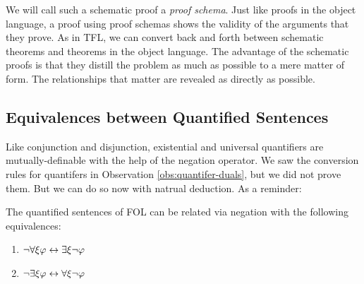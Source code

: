 
We will call such a schematic proof a \emph{proof schema}. Just like proofs
in the object language, a proof using proof schemas shows the validity of the
arguments that they prove. As in TFL, we can convert back and forth between
schematic theorems and theorems in the object language. The advantage of the
schematic proofs is that they distill the problem as much as possible to a mere
matter of form. The relationships that matter are revealed as directly as
possible.

\subsection{Equivalences between Quantified Sentences}

Like conjunction and disjunction, existential and universal quantifiers are
mutually-definable with the help of the negation operator. We saw the conversion
rules for quantifers in Observation \ref{obs:quantifer-duals}, but we did not
prove them. But we can do so now with natrual deduction. As a reminder:

\begin{observation}
  \label{obs:quantifer-duals-formal}
  The quantified sentences of FOL can be related via negation with the following
  equivalences:
  \begin{enumerate}
  \item $\neg\forall\xi\varphi\leftrightarrow\exists\xi\neg\varphi$
  \item $\neg\exists\xi\varphi\leftrightarrow\forall\xi\neg\varphi$
  \end{enumerate}
\end{observation}

